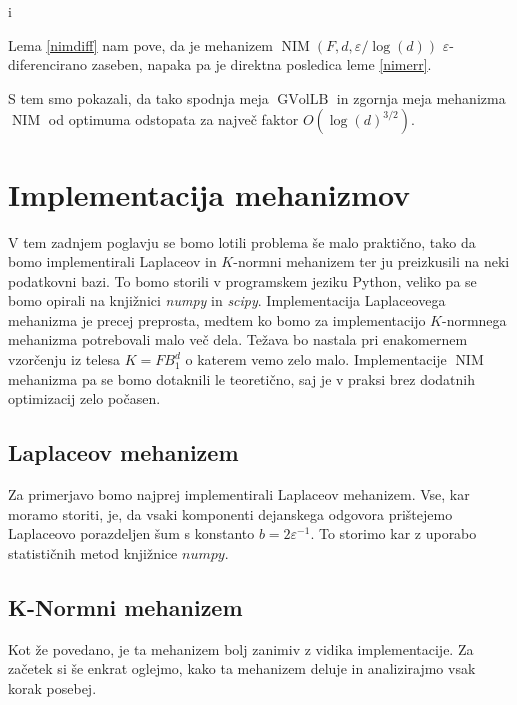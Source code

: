 i\documentclass[mat1]{fmfdelo}
\DeclareMathOperator{\NIM}{NIM}
\begin{document}
\begin{dokaz}
    Lema \ref{nimdiff} nam pove, da je mehanizem $\NIM(F,d,\varepsilon/\log(d))$ $\varepsilon$-diferencirano zaseben, napaka pa je direktna posledica leme \ref{nimerr}.
\end{dokaz}

S tem smo pokazali, da tako spodnja meja $\operatorname{GVolLB}$ in zgornja meja mehanizma $\NIM$ od optimuma odstopata za največ faktor $O(\log(d)^{3/2})$.


\section{Implementacija mehanizmov}

V tem zadnjem poglavju se bomo lotili problema še malo praktično, tako da bomo implementirali Laplaceov in $K$-normni mehanizem ter ju preizkusili na neki podatkovni bazi. To bomo storili v programskem jeziku Python, veliko pa se bomo opirali na knjižnici \emph{numpy} in \emph{scipy}. Implementacija Laplaceovega mehanizma je precej preprosta, medtem ko bomo za implementacijo $K$-normnega mehanizma potrebovali malo več dela. Težava bo nastala pri enakomernem vzorčenju iz telesa $K=FB_1^d$ o katerem vemo zelo malo. Implementacije $\operatorname{NIM}$ mehanizma pa se bomo dotaknili le teoretično, saj je v praksi brez dodatnih optimizacij zelo počasen.

\subsection{Laplaceov mehanizem}
Za primerjavo bomo najprej implementirali Laplaceov mehanizem. Vse, kar moramo storiti, je, da vsaki komponenti dejanskega odgovora prištejemo Laplaceovo porazdeljen šum s konstanto $b=2\varepsilon^{-1}$. To storimo kar z uporabo statističnih metod knjižnice $numpy$.

\subsection{K-Normni mehanizem}

Kot že povedano, je ta mehanizem bolj zanimiv z vidika implementacije. Za začetek si še enkrat oglejmo, kako ta mehanizem deluje in analizirajmo vsak korak posebej.
\end{document}
